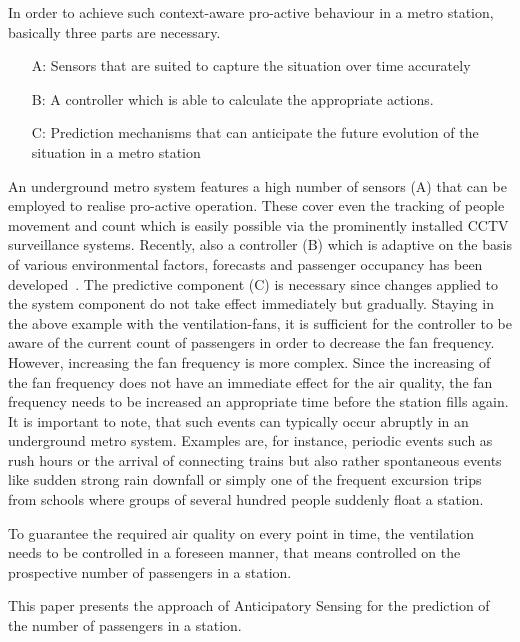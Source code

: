 In order to achieve such context-aware pro-active behaviour in a metro station, basically three parts are necessary. 
\begin{enumerate}
 \item[A:] Sensors that are suited to capture the situation over time accurately
 \item[B:] A controller which is able to calculate the appropriate actions.
 \item[C:] Prediction mechanisms that can anticipate the future evolution of the situation in a metro station
\end{enumerate}
An underground metro system features a high number of sensors (A) that can be employed to realise pro-active operation.
These cover even the tracking of people movement and count which is easily possible via the prominently installed CCTV surveillance systems.
Recently, also a controller (B) which is adaptive on the basis of various environmental factors, forecasts and passenger occupancy has been developed~\cite{guo_intelligent_2013}.
The predictive component (C) is necessary since changes applied to the system component do not take effect immediately but gradually. 
Staying in the above example with the ventilation-fans, it is sufficient for the controller to be aware of the current count of passengers in order to decrease the fan frequency. 
However, increasing the fan frequency is more complex. 
Since the increasing of the fan frequency does not have an immediate effect for the air quality, the fan frequency needs to be increased an appropriate time before the station fills again. 
It is important to note, that such events can typically occur abruptly in an underground metro system. 
Examples are, for instance, periodic events such as rush hours or the arrival of connecting trains but also rather spontaneous events like sudden strong rain downfall or simply one of the frequent excursion trips from schools where groups of several hundred people suddenly float a station. 

To guarantee the required air quality on every point in time, the ventilation needs to be controlled in a foreseen manner, that means controlled on the prospective number of passengers in a station.

This paper presents the approach of Anticipatory Sensing for the prediction of the number of passengers in a station.

